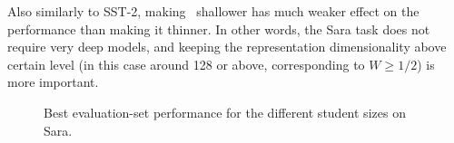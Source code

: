 {{{      Also similarly to SST-2, making \BERTS~shallower has much weaker effect on the performance than making it thinner. In other words, the Sara task does not require very deep models, and keeping the representation dimensionality above certain level (in this case around 128 or above, corresponding to $W\geq1/2$) is more important.
      \begin{figure}
      \caption{Best evaluation-set performance for the different student sizes on Sara.}
      \label{fig:size-sara}
      \end{figure}
    }
  }
}
